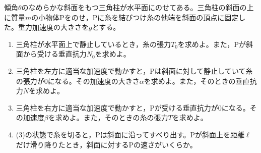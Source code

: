 \hakosyokika
\item
    \begin{mawarikomi}{80pt}{}
        傾角$\theta $のなめらかな斜面をもつ三角柱が水平面にのせてある。三角柱の斜面の上に質量$m$の小物体Pをのせ，Pに糸を結びつけ糸の他端を斜面の頂点に固定した。重力加速度の大きさを$g$とする。
        \begin{enumerate}
            \item 三角柱が水平面上で静止しているとき，糸の張力$T_0$を求めよ。また，Pが斜面から受ける垂直抗力$N_0$を求めよ。
            \item 三角柱を左方に適当な加速度で動かすと，Pは斜面に対して静止していて糸の張力が0になる。その加速度の大きさ$\alpha $を求めよ。また，そのときの垂直抗力$N$を求めよ。
            \item 三角柱を右方に適当な加速度で動かすと，Pが受ける垂直抗力が0になる。その加速度$\beta $を求めよ。また，そのときの糸の張力$T$を求めよ。
            \item (3)の状態で糸を切ると，Pは斜面に沿ってすべり出す。Pが斜面上を距離$\ell $だけ滑り降りたとき，斜面に対するPの速さがいくらか。
        \end{enumerate}
    \end{mawarikomi}